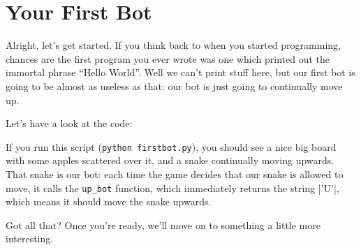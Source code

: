 \section{Your First Bot}

Alright, let’s get started.
If you think back to when you started programming, chances are the first program
you ever wrote was one which printed out the immortal phrase “Hello World”.
Well we can’t print stuff here, but our first bot is going to be almost as
useless as that: our bot is just going to continually move up.

Let’s have a look at the code:

If you run this script (\texttt{python firstbot.py}),
you should see a nice big board with some apples scattered over it, and a snake
continually moving upwards.
That snake is our bot: each time the game decides that our snake is allowed to
move, it calls the \texttt{up\_bot} function, which immediately returns the
string |'U'|, which means it should move the snake upwards.

Got all that?
Once you’re ready, we’ll move on to something a little more interesting.

